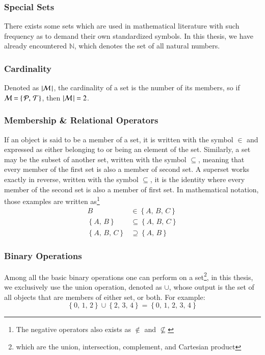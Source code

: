 \subsubsection{Special Sets}
There exists some sets which are used in mathematical literature with such frequency as to demand their own standardized symbols. In this thesis, we have already encountered $\mathbb{N}$, which denotes the set of all natural numbers.
%
\subsubsection{Cardinality}
Denoted as $|\mathcal{M}\,|$, the cardinality of a set is the number of its members, so if $\mathcal{M} = \left \{\,\mathcal{P},\,\mathcal{T}\right \}$, then $|\mathcal{M}\,| = 2$.
%
\subsubsection{Membership \& Relational Operators}
If an object is said to be a member of a set, it is written with the symbol $\in$ and expressed as either belonging to or being an element of the set. Similarly, a set may be the subset of another set, written with the symbol $\subseteq$, meaning that every member of the first set is also a member of second set. A superset works exactly in reverse, written with the symbol $\subseteq$, it is the identity where every member of the second set is also a member of first set. In mathematical notation, those examples are written as\footnote{The negative operators also exists as $\notin$ and $\nsubseteq$}
\begin{align}
	B & \in \left \{A,\,B,\,C\right \} \\
	\left \{A,\,B\right \} & \subseteq \left \{A,\,B,\,C\right \} \\
	\left \{A,\,B,\,C\right \} & \supseteq \left \{A,\,B\right \}
\end{align}
%
\subsubsection{Binary Operations}
Among all the basic binary operations one can perform on a set\footnote{which are the union, intersection, complement, and Cartesian product}, in this thesis, we exclusively use the union operation, denoted as $\cup$, whose output is the set of all objects that are members of either set, or both. For example:
\begin{equation}
	\left \{0,\,1,\,2\right \} \cup \left \{2,\,3,\,4\right \} = \left \{0,\,1,\,2,\,3,\,4\right \}
\end{equation}
%
%
%
